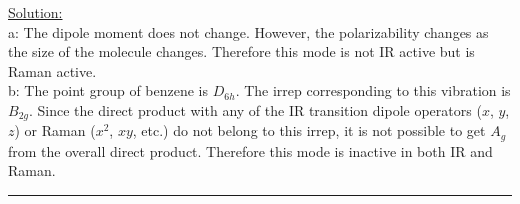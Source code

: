 \noindent
\underline{Solution:}\\

\noindent
a: The dipole moment does not change. However, the polarizability changes as the size of the molecule changes. Therefore this
mode is not IR active but is Raman active.\\
b: The point group of benzene is $D_{6h}$. The irrep corresponding to this vibration is $B_{2g}$. Since the direct product with
any of the IR transition dipole operators ($x$, $y$, $z$) or Raman ($x^2$, $xy$, etc.) do not belong to this irrep, it is not
possible to get $A_g$ from the overall direct product. Therefore this mode is inactive in both IR and Raman.

\hrule\vspace{0.5cm}



